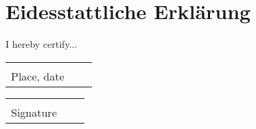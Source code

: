 \chapter*{Eidesstattliche Erklärung}

\thispagestyle{empty} %

I hereby certify...


\vspace{1,5 cm} 
\begin{tabular}{p{7cm}p{.5cm}l}
\dotfill \\ 
Place, date
\end{tabular}%
\hfill 
\begin{tabular}{p{7cm}p{.5cm}l}
\dotfill \\ 
Signature
\end{tabular}%